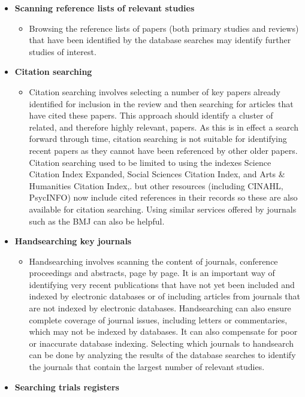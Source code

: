 \documentclass[
  11pt,
  a4paper,
  DIV=11,
  numbers=noendperiod]{scrreprt}
\providecommand{\tightlist}{%
  \setlength{\itemsep}{0pt}\setlength{\parskip}{0pt}}
\begin{document}
\begin{itemize}
\item
  \textbf{Scanning reference lists of relevant studies}

  \begin{itemize}
  \tightlist
  \item
    Browsing the reference lists of papers (both primary studies and
    reviews) that have been identified by the database searches may
    identify further studies of interest.
  \end{itemize}
\item
  \textbf{Citation searching}

  \begin{itemize}
  \tightlist
  \item
    Citation searching involves selecting a number of key papers already
    identified for inclusion in the review and then searching for
    articles that have cited these papers. This approach should identify
    a cluster of related, and therefore highly relevant, papers. As this
    is in effect a search forward through time, citation searching is
    not suitable for identifying recent papers as they cannot have been
    referenced by other older papers. Citation searching used to be
    limited to using the indexes Science Citation Index Expanded, Social
    Sciences Citation Index, and Arts \& Humanities Citation Index,. but
    other resources (including CINAHL, PsycINFO) now include cited
    references in their records so these are also available for citation
    searching. Using similar services offered by journals such as the
    BMJ can also be helpful.
  \end{itemize}
\item
  \textbf{Handsearching key journals}

  \begin{itemize}
  \tightlist
  \item
    Handsearching involves scanning the content of journals, conference
    proceedings and abstracts, page by page. It is an important way of
    identifying very recent publications that have not yet been included
    and indexed by electronic databases or of including articles from
    journals that are not indexed by electronic databases. Handsearching
    can also ensure complete coverage of journal issues, including
    letters or commentaries, which may not be indexed by databases. It
    can also compensate for poor or inaccurate database indexing.
    Selecting which journals to handsearch can be done by analyzing the
    results of the database searches to identify the journals that
    contain the largest number of relevant studies.
  \end{itemize}
\item
  \textbf{Searching trials registers}


\end{itemize}
\end{document}
